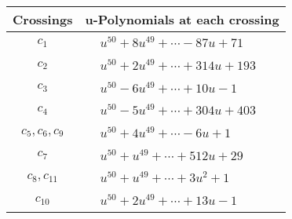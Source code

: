 \documentclass[1p]{elsarticle_modified}
\theoremstyle{definition}
\begin{document}
\begin{tabular}{m{50pt}|m{274pt}}
Crossings & \hspace{64pt}u-Polynomials at each crossing \\
\hline $$\begin{aligned}c_{1}\end{aligned}$$&$\begin{aligned}
&u^{50}+8 u^{49}+\cdots-87 u+71
\end{aligned}$\\
\hline $$\begin{aligned}c_{2}\end{aligned}$$&$\begin{aligned}
&u^{50}+2 u^{49}+\cdots+314 u+193
\end{aligned}$\\
\hline $$\begin{aligned}c_{3}\end{aligned}$$&$\begin{aligned}
&u^{50}-6 u^{49}+\cdots+10 u-1
\end{aligned}$\\
\hline $$\begin{aligned}c_{4}\end{aligned}$$&$\begin{aligned}
&u^{50}-5 u^{49}+\cdots+304 u+403
\end{aligned}$\\
\hline $$\begin{aligned}c_{5},c_{6},c_{9}\end{aligned}$$&$\begin{aligned}
&u^{50}+4 u^{49}+\cdots-6 u+1
\end{aligned}$\\
\hline $$\begin{aligned}c_{7}\end{aligned}$$&$\begin{aligned}
&u^{50}+u^{49}+\cdots+512 u+29
\end{aligned}$\\
\hline $$\begin{aligned}c_{8},c_{11}\end{aligned}$$&$\begin{aligned}
&u^{50}+u^{49}+\cdots+3 u^2+1
\end{aligned}$\\
\hline $$\begin{aligned}c_{10}\end{aligned}$$&$\begin{aligned}
&u^{50}+2 u^{49}+\cdots+13 u-1
\end{aligned}$\\
\hline
\end{tabular}\\~\\
\end{document}
